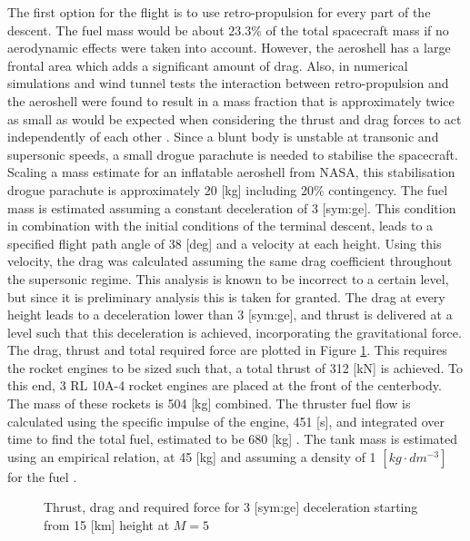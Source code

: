 The first option for the flight is to use retro-propulsion for every part of the descent. The fuel mass would be about $23.3\%$ of the total spacecraft mass if no aerodynamic effects were taken into account. However, the aeroshell has a large frontal area which adds a significant amount of drag. Also, in numerical simulations and wind tunnel tests the interaction between retro-propulsion and the aeroshell were found to result in a mass fraction that is approximately twice as small as would be expected when considering the thrust and drag forces to act independently of each other \cite{Korzun2009}. Since a blunt body is unstable at transonic and supersonic speeds, a small drogue parachute is needed to stabilise the spacecraft. Scaling a mass estimate for an inflatable aeroshell from NASA, this stabilisation drogue parachute is approximately 20 [kg] including 20$\%$ contingency.
The fuel mass is estimated assuming a constant deceleration of 3 [\gls{sym:ge}]. This condition in combination with the initial conditions of the terminal descent, leads to a specified flight path angle of 38 [deg] and a velocity at each height. Using this velocity, the drag was calculated assuming the same drag coefficient throughout the supersonic regime. This analysis is known to be incorrect to a certain level, but since it is preliminary analysis this is taken for granted. The drag at every height leads to a deceleration lower than 3 [\gls{sym:ge}], and thrust is delivered at a level such that this deceleration is achieved, incorporating the gravitational force. The drag, thrust and total required force are plotted in Figure \ref{fig:TDforce}. This requires the rocket engines to be sized such that, a total thrust of 312 [kN] is achieved. To this end, 3 RL 10A-4 rocket engines are placed at the front of the centerbody. The mass of these rockets is 504 [kg] combined. The thruster fuel flow is calculated using the specific impulse of the engine, 451 [s], and integrated over time to find the total fuel, estimated to be 680 [kg] \cite{Wertz2011}. The tank mass is estimated using an empirical relation, at 45 [kg] and assuming a density of 1 $[kg\cdot dm^{-3}]$ for the fuel \cite{Wertz2011}.

\begin{figure}
	\centering
	\setlength{} 
	\setlength{}
	
	\caption{Thrust, drag and required force for 3 [\gls{sym:ge}] deceleration starting from 15 [km] height at $M=5$}
	\label{fig:TDforce}
\end{figure}


